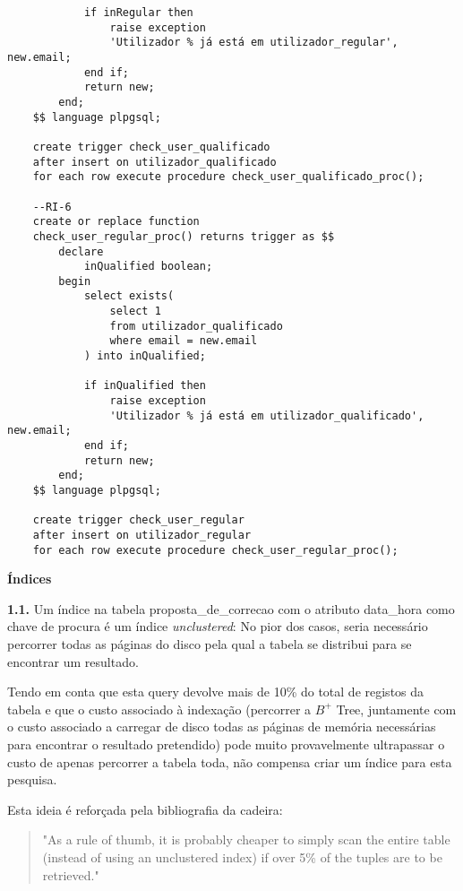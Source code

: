 \documentclass[12pt]{report}
\begin{document}
\begin{verbatim}
            if inRegular then
                raise exception
                'Utilizador % já está em utilizador_regular', new.email;
            end if;
            return new;
        end;
    $$ language plpgsql;

    create trigger check_user_qualificado
    after insert on utilizador_qualificado
    for each row execute procedure check_user_qualificado_proc();

    --RI-6
    create or replace function
    check_user_regular_proc() returns trigger as $$
        declare
            inQualified boolean;
        begin
            select exists(
                select 1
                from utilizador_qualificado
                where email = new.email
            ) into inQualified;

            if inQualified then
                raise exception
                'Utilizador % já está em utilizador_qualificado', new.email;
            end if;
            return new;
        end;
    $$ language plpgsql;

    create trigger check_user_regular
    after insert on utilizador_regular
    for each row execute procedure check_user_regular_proc();
    \end{verbatim}
    \normalsize

    \newpage
    \Large
    \textbf{Índices}
    \normalsize \\
    \par \textbf{1.1.} Um índice na tabela proposta\_de\_correcao com o atributo data\_hora como chave de procura é um índice \textit{unclustered}: No pior dos casos, seria necessário percorrer todas as páginas do disco pela qual a tabela se distribui para se encontrar um resultado.

    \par Tendo em conta que esta query devolve mais de 10\% do total de registos da tabela e que o custo associado à indexação (percorrer a $B^+$ Tree, juntamente com o custo associado a carregar de disco todas as páginas de memória necessárias para encontrar o resultado pretendido) pode muito provavelmente ultrapassar o custo de apenas percorrer a tabela toda, não compensa criar um índice para esta pesquisa.

    \par Esta ideia é reforçada pela bibliografia da cadeira:
    \begin{quotation}
        "As a rule of thumb, it is probably cheaper to simply scan the entire table (instead of using an unclustered index) if over 5\% of the tuples are to be retrieved."
    \end{quotation}
\end{document}
